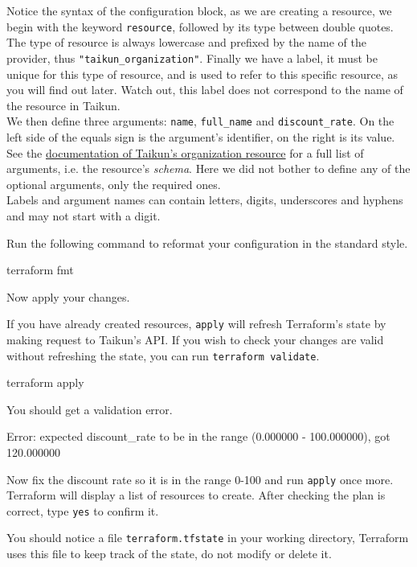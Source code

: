 \begin{tip}
Notice the syntax of the configuration block, as we are creating a resource,
we begin with the keyword \texttt{resource}, followed by its type between double quotes.
The type of resource is always lowercase and prefixed by the name of the provider,
thus \texttt{"taikun\_organization"}.
Finally we have a label, it must be unique for this type of resource, and is used
to refer to this specific resource, as you will find out later.
Watch out, this label does not correspond to the name of the resource in Taikun.\\

We then define three arguments: \texttt{name}, \texttt{full\_name} and \texttt{discount\_rate}.
On the left side of the equals sign is the argument's identifier, on the right is its value.
See the \href{https://intuinewin.github.io/taikun-docs/resources/organization.html}{documentation of Taikun's organization resource} for a full list of arguments, i.e. the resource's \textit{schema}.
Here we did not bother to define any of the optional arguments, only the required ones.\\

Labels and argument names can contain letters, digits, underscores and hyphens and may not start with a digit.
\end{tip}
Run the following command to reformat your configuration in the standard style.
\begin{shell}
terraform fmt
\end{shell}
Now apply your changes.
\begin{tip}
If you have already created resources, \texttt{apply} will refresh Terraform's state
by making request to Taikun's API. If you wish to check your changes are valid
without refreshing the state, you can run \texttt{terraform validate}.
\end{tip}
\begin{shell}
terraform apply
\end{shell}
You should get a validation error.
\begin{raw}
Error: expected discount_rate to be in the range (0.000000 - 100.000000), got 120.000000
\end{raw}
Now fix the discount rate so it is in the range 0-100 and run \texttt{apply} once more.
Terraform will display a list of resources to create.
After checking the plan is correct, type \texttt{yes} to confirm it.
\begin{tip}
You should notice a file \texttt{terraform.tfstate} in your working directory,
Terraform uses this file to keep track of the state, do not modify or delete it.
\end{tip}
